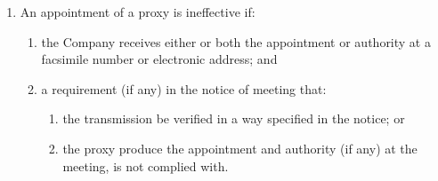 \begin{enumerate}[label=(\alph*)]
    \item An appointment of a proxy is ineffective if:
    \begin{enumerate}[label=(\roman*)]
        \item the Company receives either or both the appointment or authority at a facsimile number or electronic address; and
        \item a requirement (if any) in the notice of meeting that:
        \begin{enumerate}[label=(\alph*)]
            \item the transmission be verified in a way specified in the notice; or
            \item the proxy produce the appointment and authority (if any) at the meeting, is not complied with.
        \end{enumerate}
    \end{enumerate}
\end{enumerate} 
